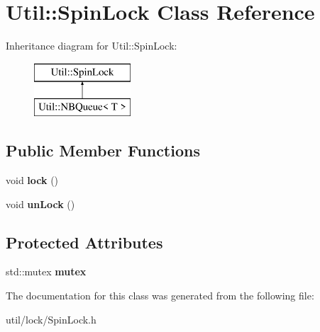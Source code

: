 \hypertarget{class_util_1_1_spin_lock}{}\section{Util\+:\+:Spin\+Lock Class Reference}
\label{class_util_1_1_spin_lock}
Inheritance diagram for Util\+:\+:Spin\+Lock\+:\begin{figure}[H]
\begin{center}
\leavevmode
\includegraphics[height=2.000000cm]{class_util_1_1_spin_lock}
\end{center}
\end{figure}
\subsection*{Public Member Functions}
\begin{DoxyCompactItemize}
\item 
\mbox{\label{class_util_1_1_spin_lock_a378ec825abf816959f51c9e68793a78b}} 
void {\bfseries lock} ()
\item 
\mbox{\label{class_util_1_1_spin_lock_a13079b44171b0b9750db9b20bb12933f}} 
void {\bfseries un\+Lock} ()
\end{DoxyCompactItemize}
\subsection*{Protected Attributes}
\begin{DoxyCompactItemize}
\item 
\mbox{\label{class_util_1_1_spin_lock_a1db6f97fee8f6e37a89eba76b5d2dab5}} 
std\+::mutex {\bfseries mutex}
\end{DoxyCompactItemize}


The documentation for this class was generated from the following file\+:\begin{DoxyCompactItemize}
\item 
util/lock/Spin\+Lock.\+h\end{DoxyCompactItemize}
